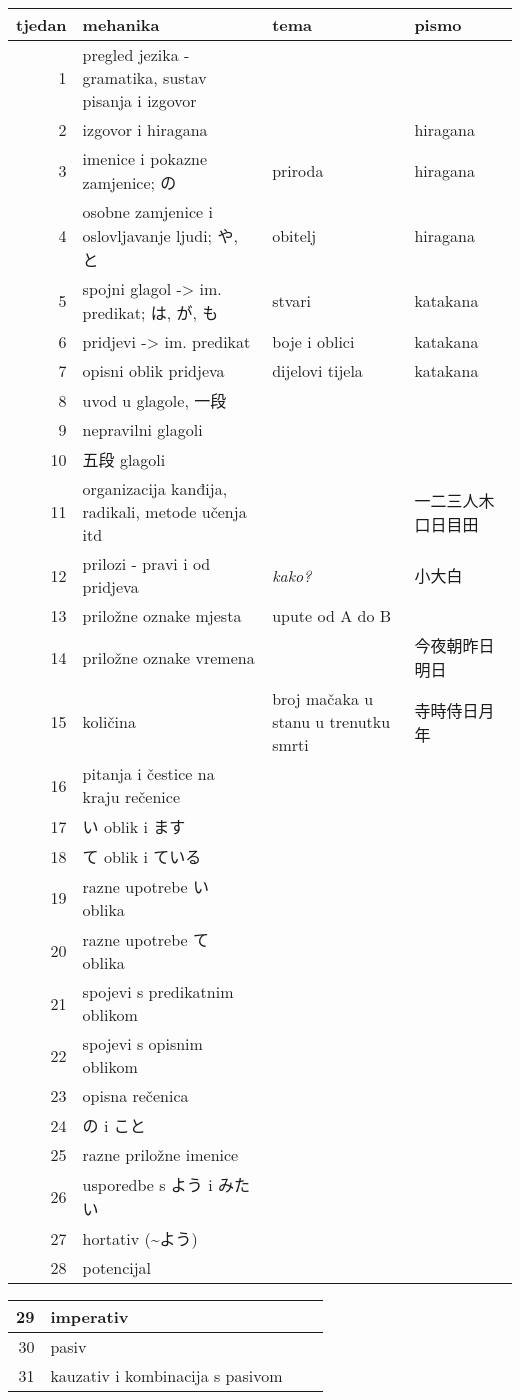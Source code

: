 

\author{Tomislav Mamić}


	
	\noindent
	\begin{tabular}{|r|p{150pt}|p{150pt}|p{120pt}|}
		\hline
		\textbf{tjedan}&\textbf{mehanika}&\textbf{tema}&\textbf{pismo}\\
		\hline
		1&pregled jezika - gramatika, sustav pisanja i izgovor&&\\
		\hline
		2&izgovor i hiragana&&hiragana\\
		\hline
		3&imenice i pokazne zamjenice; の&priroda&hiragana\\
		\hline
		4&osobne zamjenice i oslovljavanje ljudi; や, と&obitelj&hiragana\\
		\hline
		5&spojni glagol -> im. predikat; は, が, も&stvari&katakana\\
		\hline
		6&pridjevi -> im. predikat&boje i oblici&katakana\\
		\hline
		7&opisni oblik pridjeva&dijelovi tijela&katakana\\
		\hline
		8&uvod u glagole, 一段&&\\
		\hline
		9&nepravilni glagoli&&\\
		\hline
		10&五段 glagoli&&\\
		\hline
		11&organizacija kanđija, radikali, metode učenja itd&&一二三人木口日目田\\
		\hline
		12&prilozi - pravi i od pridjeva&\textit{kako?}&小大白\\
		\hline
		13&priložne oznake mjesta&upute od A do B&\\
		\hline
		14&priložne oznake vremena&&今夜朝昨日明日\\
		\hline
		15&količina&broj mačaka u stanu u trenutku smrti&寺時侍日月年\\
		\hline
		16&pitanja i čestice na kraju rečenice&&\\
		\hline
		17&い oblik i ます&&\\
		\hline
		18&て oblik i ている&&\\
		\hline
		19&razne upotrebe い oblika&&\\
		\hline
		20&razne upotrebe て oblika&&\\
		\hline
		21&spojevi s predikatnim oblikom&&\\
		\hline
		22&spojevi s opisnim oblikom&&\\
		\hline
		23&opisna rečenica&&\\
		\hline
		24&の i こと&&\\
		\hline
		25&razne priložne imenice&&\\
		\hline
		26&usporedbe s よう i みたい&&\\
		\hline
		27&hortativ (\textasciitilde よう)&&\\
		\hline
		28&potencijal&&\\
		\hline
	\end{tabular}
	\noindent
	
	\begin{tabular}{|r|p{150pt}|p{150pt}|p{120pt}|}
		\hline
		29&imperativ&&\\
		\hline
		30&pasiv&&\\
		\hline
		31&kauzativ i kombinacija s pasivom&&\\
		\hline
	\end{tabular}

